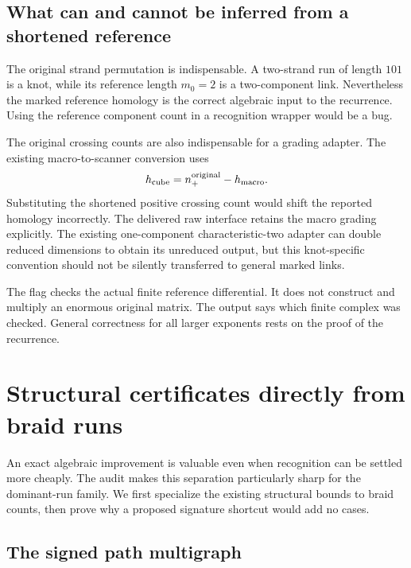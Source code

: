 \subsection{What can and cannot be inferred from a shortened reference}

The original strand permutation is indispensable. A two-strand run of
length \(101\) is a knot, while its reference length \(m_0=2\) is a
two-component link. Nevertheless the marked reference homology is the
correct algebraic input to the recurrence. Using the reference component
count in a recognition wrapper would be a bug.

The original crossing counts are also indispensable for a grading adapter.
The existing macro-to-scanner conversion uses
\[
h_{\rm cube}=n_+^{\rm original}-h_{\rm macro}.
\]
Substituting the shortened positive crossing count would shift the reported
homology incorrectly. The delivered raw interface retains the macro
grading explicitly. The existing one-component characteristic-two adapter
can double reduced dimensions to obtain its unreduced output, but this
knot-specific convention should not be silently transferred to general
marked links.

The flag  checks the actual finite reference
differential. It does not construct and multiply an enormous original
matrix. The output says which finite complex was checked. General
correctness for all larger exponents rests on the proof of the recurrence.

\section{Structural certificates directly from braid runs}\label{sec:structural}

An exact algebraic improvement is valuable even when recognition can be
settled more cheaply. The audit makes this separation particularly sharp
for the dominant-run family. We first specialize the existing structural
bounds to braid counts, then prove why a proposed signature shortcut
would add no cases.

\subsection{The signed path multigraph}

